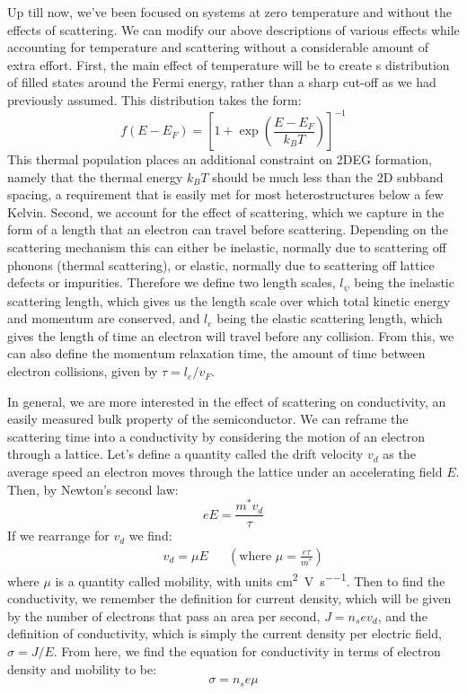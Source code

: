 Up till now, we've been focused on systems at zero temperature and without the effects of scattering. We can modify our above
descriptions of various effects while accounting for temperature and scattering without a considerable amount of extra effort.
First, the main effect of temperature will be to create s distribution of filled states around the Fermi energy, rather
than a sharp cut-off as we had previously assumed. This distribution takes the form:
\begin{equation}
  f(E - E_F) = \left[1 + \exp\left(\frac{E - E_F}{k_B T}\right)\right]^{-1}
\end{equation}
This thermal population places an additional constraint on 2DEG formation, namely that the thermal energy $k_B T$ should be much less than the
2D subband spacing, a requirement that is easily met for most heterostructures below a few Kelvin. Second, we account for the
effect of scattering, which we capture in the form of a length that an electron can travel before scattering. Depending on the scattering
mechanism this can either be inelastic, normally due to scattering off phonons (thermal scattering), or elastic, normally due to
scattering off lattice defects or impurities. Therefore we define two length scales, $l_\psi$ being the inelastic scattering length,
which gives us the length scale over which total kinetic energy and momentum are conserved, and $l_e$ being the elastic scattering
length, which gives the length of time an electron will travel before any collision. From this, we can also define the momentum relaxation time, the
amount of time between electron collisions, given by $\tau = l_e/v_F$.

In general, we are more interested in the effect of scattering on conductivity, an easily measured bulk property of
the semiconductor. We can reframe the scattering time into a conductivity by considering the motion of an electron
through a lattice. Let's define a quantity called the drift velocity $v_d$ as the average speed an electron moves through
the lattice under an accelerating field $E$. Then, by Newton's second law:
\begin{equation}
  eE = \frac{m^* v_d}{\tau}
\end{equation}
If we rearrange for $v_d$ we find:
\begin{align}
  && v_d = \mu E && (\textrm{where~} \mu = \frac{e \tau}{m^*})
\end{align}
where $\mu$ is a quantity called mobility, with units \si{\square\centi\meter\per\volt\per\second}.
Then to find the conductivity, we remember the definition for current
density, which will be given by the number of electrons that pass an area per second, $J = n_s e v_d$, and the
definition of conductivity, which is simply the current density per electric field, $\sigma = J/E$. From here,
we find the equation for conductivity in terms of electron density and mobility to be:
\begin{equation}
  \sigma = n_s e \mu
\end{equation}

